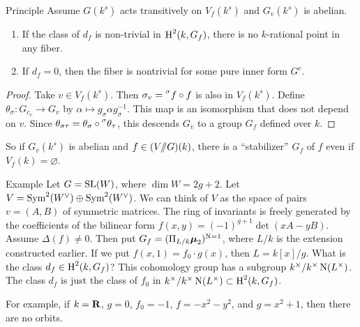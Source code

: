 \begin{enonce}{Principle}
Assume $G(k^s)$ acts transitively on $V_f(k^s)$ and $G_v(k^s)$ is abelian. 
\begin{enumerate}
  \item If the class of $d_f$ is non-trivial in $\operatorname{H}^2(k,G_f)$, there is no 
    $k$-rational point in any fiber. 
  \item If $d_f=0$, then the fiber is nontrivial for some pure inner form $G^c$. 
\end{enumerate}
\end{enonce}
\begin{proof}
Take $v\in V_f(k^s)$. Then $\sigma_v = \prescript{\sigma}{}{f}\circ f$ is also 
in $V_f(k^s)$. Define $\theta_\sigma:G_{c_v} \to G_v$ by 
$\alpha\mapsto g_\sigma \alpha g_\sigma^{-1}$. This map is an isomorphism that 
does not depend on $v$. Since 
$\theta_{\sigma\tau} = \theta_\sigma\circ\prescript{\sigma}{}{\theta_\tau}$, 
this descends $G_v$ to a group $G_f$ defined over $k$. 
\end{proof}

So if $G_v(k^s)$ is abelian and $f\in (V/\!\!/ G)(k)$, there is a ``stabilizer'' 
$G_f$ of $f$ even if $V_f(k)=\varnothing$. 

\begin{enonce}[remark]{Example}
Let $G=\operatorname{SL}(W)$, where $\dim W=2 g+2$. Let 
$V=\operatorname{Sym}^2(W^\vee)\oplus \operatorname{Sym}^2(W^\vee)$. We can think of 
$V$ as the space of pairs $v=(A,B)$ of symmetric matrices. The ring of 
invariants is freely generated by the coefficients of the bilinear form 
$f(x,y) = (-1)^{g+1}\det(x A-y B)$. Assume $\Delta(f)\ne 0$. Then put 
$G_f=(\Pi_{L/k}\boldsymbol\mu_2)^{\operatorname{N}=1}$, where $L/k$ is the extension 
constructed earlier. If we put $f(x,1) = f_0 \cdot g(x)$, then 
$L=k[x]/g$. What is the class $d_f\in \operatorname{H}^2(k,G_f)$? This cohomology group 
has a subgroup $k^\times / k^\times \operatorname{N}(L^\times)$. The class $d_f$ is just 
the class of $f_0$ in $k^\times / k^\times \operatorname{N}(L^\times)\subset \operatorname{H}^2(k,G_f)$. 
\end{enonce}

For example, if $k=\mathbf{R}$, $g=0$, $f_0=-1$, $f=-x^2-y^2$, and $g=x^2+1$, then there 
are no orbits. 




